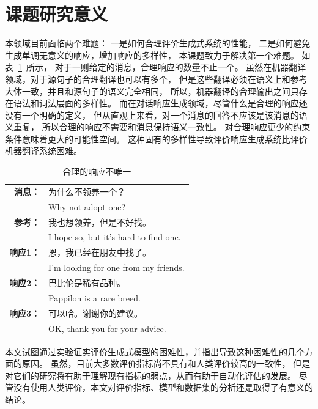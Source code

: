 \section{课题研究意义}\label{sec:research_meaning}
本领域目前面临两个难题：
一是如何合理评价生成式系统的性能，
二是如何避免生成单调无意义的响应，增加响应的多样性，
本课题致力于解决第一个难题。
如表~\ref{tab:multiple_valid_responses}~所示，
对于一则给定的消息，合理响应的数量不止一个。
虽然在机器翻译领域，对于源句子的合理翻译也可以有多个，
但是这些翻译必须在语义上和参考大体一致，并且和源句子的语义完全相同，
所以，机器翻译的合理输出之间只存在语法和词法层面的多样性。
而在对话响应生成领域，尽管什么是合理的响应还没有一个明确的定义，
但从直观上来看，对一个消息的回答不应该是该消息的语义重复，
所以合理的响应不需要和消息保持语义一致性。
对合理响应更少的约束条件意味着更大的可能性空间。
这种固有的多样性导致评价响应生成系统比评价机器翻译系统困难。
\begin{table}
    \centering
    \caption{合理的响应不唯一}
    \label{tab:multiple_valid_responses}
    \begin{tabular}{rl}
        \toprule
        \midrule
        \textbf{消息：} & 为什么不领养一个？ \\
        & Why not adopt one? \\
        \textbf{参考：} & 我也想领养，但是不好找。 \\
        & I hope so, but it's hard to find one. \\
        \midrule
        \textbf{响应1：} & 恩，我已经在朋友中找了。 \\
        & I'm looking for one from my friends. \\
        \textbf{响应2：} & 巴比伦是稀有品种。 \\
        & Pappilon is a rare breed. \\
        \textbf{响应3：} & 可以哈。谢谢你的建议。 \\
        & OK, thank you for your advice. \\
        \bottomrule
    \end{tabular}
\end{table}

本文试图通过实验证实评价生成式模型的困难性，并指出导致这种困难性的几个方面的原因。
虽然，目前大多数评价指标尚不具有和人类评价较高的一致性，
但是对它们的研究将有助于理解现有指标的弱点，从而有助于自动化评估的发展。
尽管没有使用人类评价，本文对评价指标、模型和数据集的分析还是取得了有意义的结论。

